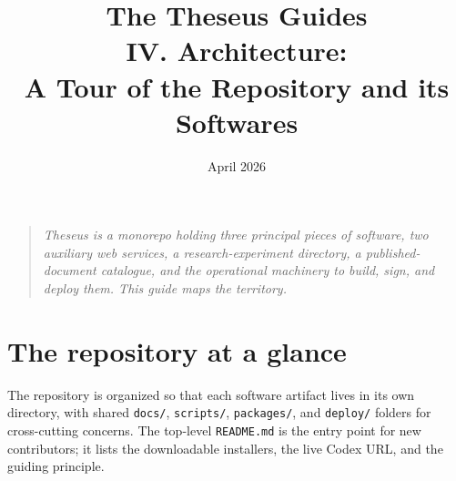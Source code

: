 \documentclass[11pt,letterpaper]{article}
\title{\textbf{The Theseus Guides}\\[6pt]\large IV. Architecture:\\A Tour of the Repository and its Softwares}
\date{April 2026}
\author{}
\newcommand{\file}[1]{\texttt{#1}}
\begin{document}
\maketitle
\thispagestyle{empty}

\begin{quote}\itshape
Theseus is a monorepo holding three principal pieces of software, two auxiliary web services, a research-experiment directory, a published-document catalogue, and the operational machinery to build, sign, and deploy them. This guide maps the territory.
\end{quote}

\vspace{1em}
\tableofcontents
\newpage

\section{The repository at a glance}

The repository is organized so that each software artifact lives in its own directory, with shared \file{docs/}, \file{scripts/}, \file{packages/}, and \file{deploy/} folders for cross-cutting concerns. The top-level \file{README.md} is the entry point for new contributors; it lists the downloadable installers, the live Codex URL, and the guiding principle.
\end{document}
